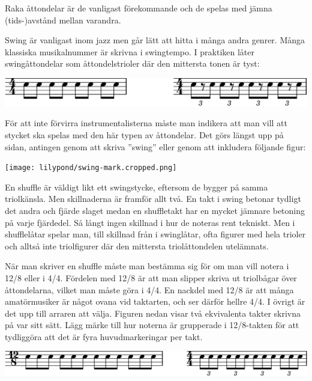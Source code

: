 Raka åttondelar är de vanligast förekommande och de spelas med jämna (tids-)avstånd mellan varandra.

Swing är vanligast inom jazz men går lätt att hitta i många andra genrer. Många klassiska musikalnummer är skrivna i swingtempo. I praktiken låter swingåttondelar som åttondelstrioler där den mittersta tonen är tyst:

\begin{center}
\includegraphics{lilypond/swing.cropped.png}
\end{center}

För att inte förvirra instrumentalisterna måste man indikera att man vill att stycket ska spelas med den här typen av åttondelar. Det görs längst upp på sidan, antingen genom att skriva ”swing” eller genom att inkludera följande figur: 

\begin{center}
    \texttt{[image: lilypond/swing-mark.cropped.png]}
\end{center}

En shuffle är väldigt likt ett swingstycke, eftersom de bygger på samma triolkänsla. Men skillnaderna är framför allt två. En takt i swing betonar tydligt det andra och fjärde slaget medan en shuffletakt har en mycket jämnare betoning på varje fjärdedel. Så långt ingen skillnad i hur de noteras rent tekniskt. Men i shufflelåtar spelar man, till skillnad från i swinglåtar, ofta figurer med hela trioler och alltså inte triolfigurer där den mittersta triolåttondelen utelämnats.

När man skriver en shuffle måste man bestämma sig för om man vill notera i 12/8 eller i 4/4. Fördelen med 12/8 är att man slipper skriva ut triolbågar över åttondelarna, vilket man måste göra i 4/4. En nackdel med 12/8 är att många amatörmusiker är något ovana vid taktarten, och ser därför hellre 4/4. I övrigt är det upp till arraren att välja. Figuren nedan visar två ekvivalenta takter skrivna på var sitt sätt. Lägg märke till hur noterna är grupperade i 12/8-takten för att tydliggöra att det är fyra huvudmarkeringar per takt. 

\begin{center}
\includegraphics{lilypond/shuffle.cropped.png}
\end{center}

